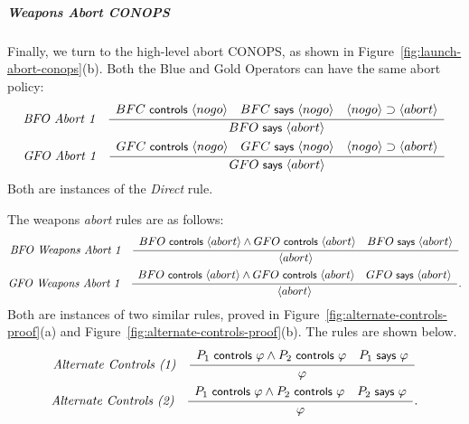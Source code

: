 \subparagraph*{Weapons Abort CONOPS}

Finally, we turn to the high-level abort CONOPS, as shown in
Figure~\ref{fig:launch-abort-conops}(b). Both the Blue and Gold
Operators can have the same abort policy:
\begin{gather*}
  \irule
  {
    \begin{array}{c}
      BFC \controls \action{nogo} \quad BFC \says \action{nogo} \quad
      \action{nogo} \implies \action{abort}
    \end{array}
  }
  {BFO \says \action{abort}}
  {BFO Abort 1}\\
  \irule
  {
    \begin{array}{c}
      GFC \controls \action{nogo} \quad GFC \says \action{nogo} \quad
      \action{nogo} \implies \action{abort}
    \end{array}
  }
  {GFO \says \action{abort}}
  {GFO Abort 1}
\end{gather*}
Both are instances of the \emph{Direct} rule. 

The weapons \emph{abort} rules are as follows:
\begin{gather*}
  \irule
  {
    \begin{array}{c}
     BFO \controls \action{abort} \wedge
      GFO \controls \action{abort} \quad BFO \says \action{abort} 
    \end{array}
  }
  {\action{abort}}
  {BFO Weapons Abort 1}\\
  \irule
  {
    \begin{array}{c}
     BFO \controls \action{abort} \wedge
      GFO \controls \action{abort} \quad GFO \says \action{abort} 
    \end{array}
  }
  {\action{abort}}
  {GFO Weapons Abort 1}.
\end{gather*}
Both are instances of two similar rules, proved in
Figure~\ref{fig:alternate-controls-proof}(a) and
Figure~\ref{fig:alternate-controls-proof}(b). The rules are shown
below.
\begin{gather*}
  \irule
  {
    \begin{array}{c}
     P_1 \controls \varphi \wedge
      P_2 \controls \varphi \quad P_1 \says \varphi 
    \end{array}
  }
  {\varphi}
  {Alternate Controls (1)}\\
  \irule
  {
    \begin{array}{c}
     P_1 \controls \varphi \wedge
      P_2 \controls \varphi \quad P_2 \says \varphi 
    \end{array}
  }
  {\varphi}
  {Alternate Controls (2)}.  
\end{gather*}

